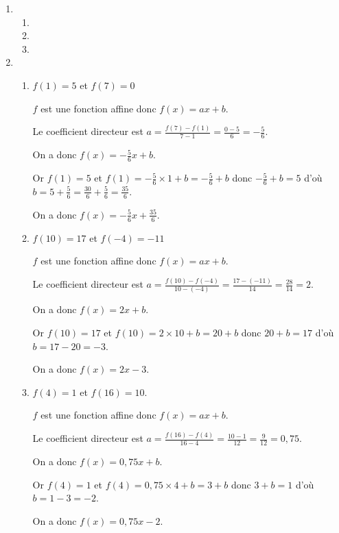 %
%
%
%
\begin{exr}
  \begin{enumerate}
  \item  
      \begin{enumerate}
      \item {}\typepoints\mypoints

      \item {}\typepoints\mypoints

%
      \item {}\typepoints\mypoints

      \end{enumerate}
  \item 
      \begin{enumerate}
      \item $f(1)=5$ et $f(7)=0$

$f$ est une fonction affine donc $f(x)=ax+b$.

Le coefficient directeur est $a=\frac{f(7)-f(1)}{7-1}=\frac{0-5}{6}=-\frac56$.

On a donc $f(x)=-\frac56x+b$.

Or $f(1)=5$ et $f(1)=-\frac56\times1+b=-\frac56+b$ donc $-\frac56+b=5$ d'où $b=5+\frac56=\frac{30}{6}+\frac56=\frac{35}{6}$.

On a donc $f(x)=-\frac56x+\frac{35}{6}$.
      \item $f(10)=17$ et $f(-4)=-11$

$f$ est une fonction affine donc $f(x)=ax+b$.

Le coefficient directeur est $a=\frac{f(10)-f(-4)}{10-(-4)}=\frac{17-(-11)}{14}=\frac{28}{14}=2$.

On a donc $f(x)=2x+b$.

Or $f(10)=17$ et $f(10)=2\times10+b=20+b$ donc $20+b=17$ d'où $b=17-20=-3$.

On a donc $f(x)=2x-3$.
      \item $f(4)=1$ et $f(16)=10$.

$f$ est une fonction affine donc $f(x)=ax+b$.

Le coefficient directeur est $a=\frac{f(16)-f(4)}{16-4}=\frac{10-1}{12}=\frac{9}{12}=0,75$.

On a donc $f(x)=0,75x+b$.

Or $f(4)=1$ et $f(4)=0,75\times4+b=3+b$ donc $3+b=1$ d'où $b=1-3=-2$.

On a donc $f(x)=0,75x-2$.
      \end{enumerate}
 \end{enumerate}
\end{exr}
%
%
%
